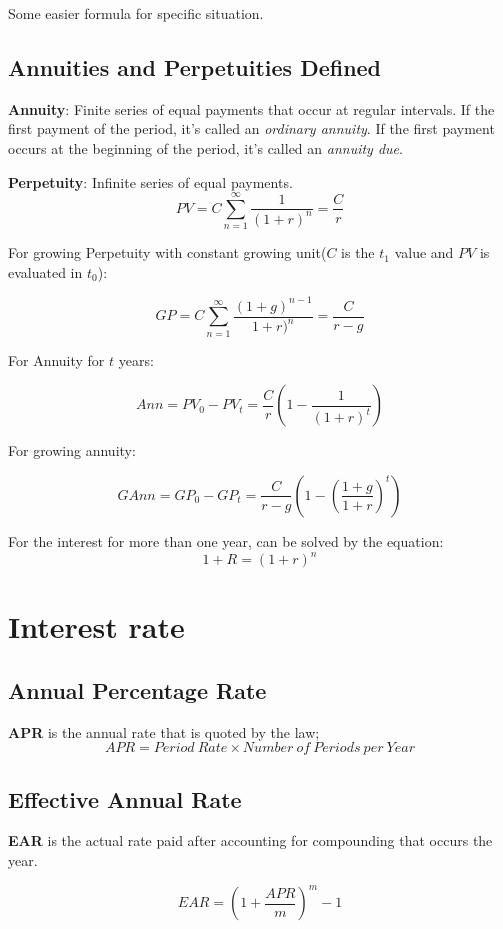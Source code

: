\documentclass[10pt, a4paper]{article}
\begin{document}
        Some easier formula for specific situation. 

        \subsection{Annuities and Perpetuities Defined}
        
        \textbf{Annuity}: Finite series of equal payments that occur at regular intervals. If the first payment of the period, it's called an \emph{ordinary annuity}. If the first payment occurs at the beginning of the period, it's called an \emph{annuity due}. 

        \textbf{Perpetuity}: Infinite series of equal payments.
        $$PV = C\sum_{n = 1}^{\infty}\frac{1}{(1 + r)^n} = \frac{C}{r}$$

        For growing Perpetuity with constant growing unit($C$ is the $t_1$ value and $PV$ is evaluated in $t_0$): 

        $$GP = C\sum_{n = 1}^{\infty}\frac{(1 + g)^{n - 1}}{{1 + r)^n}} = \frac{C}{r - g}$$

        For Annuity for $t$ years:

        $$Ann = PV_{0} - PV_{t} = \frac{C}{r}( 1 - \frac{1}{(1 + r)^t})$$

        For growing annuity:

        $$GAnn = GP_0 - GP_t = \frac{C}{r - g}(1 - (\frac{1 + g}{1 + r})^t)$$

        For the interest for more than one year, can be solved by the equation:
        $$1 + R = (1 + r) ^ n$$

\section{Interest rate}
    \subsection{Annual Percentage Rate}
        \textbf{APR} is the annual rate that is quoted by the law; 
            $$APR = Period\ Rate \times Number\ of\ Periods\ per\ Year$$
    \subsection{Effective Annual Rate}
        \textbf{EAR} is the actual rate paid after accounting for compounding that occurs the year.
        
        $$EAR = (1 + \frac{APR}{m})^m - 1$$
\end{document}
